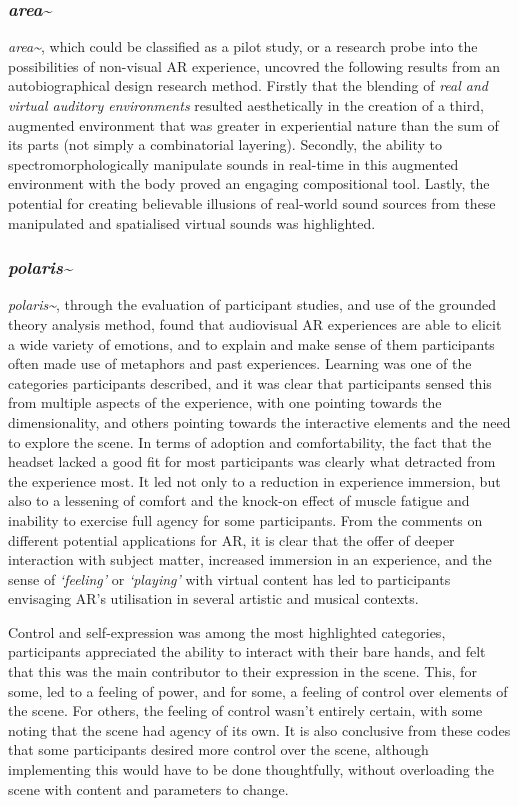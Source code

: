\subsubsection{\textit{area\textasciitilde{}}}
\textit{area\textasciitilde{}}, which could be classified as a pilot study, or a research probe into the possibilities of non-visual AR experience, uncovred the following results from an autobiographical design research method. Firstly that the blending of \textit{real and virtual auditory environments} resulted aesthetically in the creation of a third, augmented environment that was greater in experiential nature than the sum of its parts (not simply a combinatorial layering). Secondly, the ability to spectromorphologically manipulate sounds in real-time in this augmented environment with the body proved an engaging compositional tool. Lastly, the potential for creating believable illusions of real-world sound sources from these manipulated and spatialised virtual sounds was highlighted.

\subsubsection{\textit{polaris\textasciitilde{}}}
\textit{polaris\textasciitilde{}}, through the evaluation of participant studies, and use of the grounded theory analysis method, found that audiovisual AR experiences are able to elicit a wide variety of emotions, and to explain and make sense of them participants often made use of metaphors and past experiences. Learning was one of the categories participants described, and it was clear that participants sensed this from multiple aspects of the experience, with one pointing towards the dimensionality, and others pointing towards the interactive elements and the need to explore the scene. In terms of adoption and comfortability, the fact that the headset lacked a good fit for most participants was clearly what detracted from the experience most. It led not only to a reduction in experience immersion, but also to a lessening of comfort and the knock-on effect of muscle fatigue and inability to exercise full agency for some participants. From the comments on different potential applications for AR, it is clear that the offer of deeper interaction with subject matter, increased immersion in an experience, and the sense of \textit{`feeling'} or \textit{`playing'} with virtual content has led to participants envisaging AR's utilisation in several artistic and musical contexts. 

Control and self-expression was among the most highlighted categories, participants appreciated the ability to interact with their bare hands, and felt that this was the main contributor to their expression in the scene. This, for some, led to a feeling of power, and for some, a feeling of control over elements of the scene. For others, the feeling of control wasn't entirely certain, with some noting that the scene had agency of its own. It is also conclusive from these codes that some participants desired more control over the scene, although implementing this would have to be done thoughtfully, without overloading the scene with content and parameters to change.

